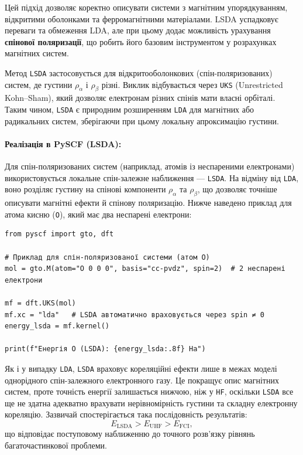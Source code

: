Цей підхід дозволяє коректно описувати системи з магнітним упорядкуванням, відкритими оболонками та ферромагнітними матеріалами.
LSDA успадковує переваги та обмеження LDA, але при цьому додає можливість урахування \textbf{спінової поляризації}, що робить його базовим інструментом у розрахунках магнітних систем.

Метод \texttt{LSDA} застосовується для відкритооболонкових (спін-поляризованих) систем, де густини $\rho_\alpha$ і $\rho_\beta$ різні.
Виклик відбувається через \texttt{UKS} (Unrestricted Kohn–Sham), який дозволяє електронам різних спінів мати власні орбіталі.
Таким чином, \texttt{LSDA} є природним розширенням \texttt{LDA} для магнітних або радикальних систем, зберігаючи при цьому локальну апроксимацію густини.



\paragraph{Реалізація в PySCF (LSDA):}
Для спін-поляризованих систем (наприклад, атомів із неспареними електронами) використовується локальне спін-залежне наближення --- \texttt{LSDA}.
На відміну від \texttt{LDA}, воно розділяє густину на спінові компоненти $\rho_\alpha$ та $\rho_\beta$, що дозволяє точніше описувати магнітні ефекти й спінову поляризацію.
Нижче наведено приклад для атома кисню (\texttt{O}), який має два неспарені електрони:

\begin{verbatim}
from pyscf import gto, dft

# Приклад для спін-поляризованої системи (атом O)
mol = gto.M(atom="O 0 0 0", basis="cc-pvdz", spin=2)  # 2 неспарені електрони

mf = dft.UKS(mol)
mf.xc = "lda"   # LSDA автоматично враховується через spin ≠ 0
energy_lsda = mf.kernel()

print(f"Енергія O (LSDA): {energy_lsda:.8f} Ha")
\end{verbatim}

Як і у випадку \texttt{LDA}, \texttt{LSDA} враховує кореляційні ефекти лише в межах моделі однорідного спін-залежного електронного газу.
Це покращує опис магнітних систем, проте точність енергії залишається нижчою, ніж у \texttt{HF}, оскільки \texttt{LSDA} все ще не здатна адекватно врахувати нерівномірність густини та складну електронну кореляцію.
Зазвичай спостерігається така послідовність результатів:
\[
E_{\text{LSDA}} > E_{\text{UHF}} > E_{\text{FCI}},
\]
що відповідає поступовому наближенню до точного розв’язку рівнянь багаточастинкової проблеми.


